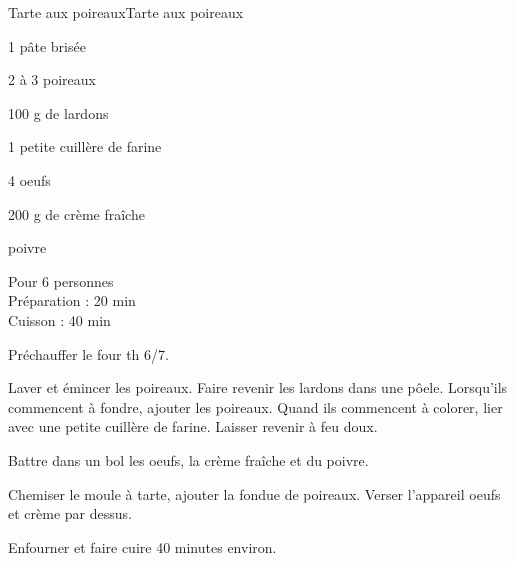 \begin{recette}{Tarte aux poireaux}{Tarte aux poireaux}

\begin{ingredients}
1 pâte brisée\par
2 à 3 poireaux\par
100 g de lardons\par
1 petite cuillère de farine\par
4 oeufs\par
200 g de crème fraîche\par
poivre\par
\end{ingredients}

\begin{infos}
Pour 6 personnes\\
Préparation : 20 min\\
Cuisson : 40 min\\
\end{infos}

\begin{etapes}
\item Préchauffer le four th 6/7.
\item Laver et émincer les poireaux. Faire revenir les lardons dans une pôele. Lorsqu'ils commencent à fondre, ajouter les poireaux. Quand ils commencent à colorer, lier avec une petite cuillère de farine. Laisser revenir à feu doux.
\item Battre dans un bol les oeufs, la crème fraîche et du poivre.
\item Chemiser le moule à tarte, ajouter la fondue de poireaux. Verser l'appareil oeufs et crème par dessus.
\item Enfourner et faire cuire 40 minutes environ.
\end{etapes}

\end{recette}